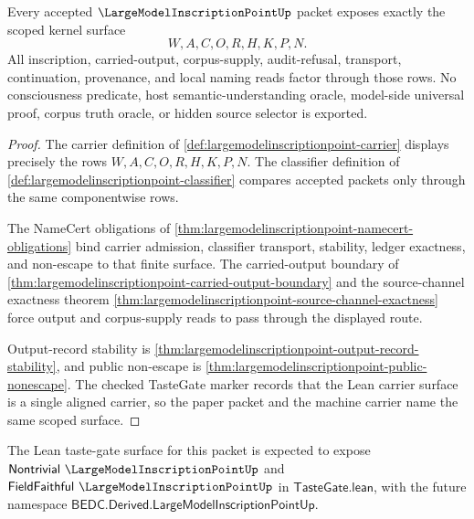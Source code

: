 \begin{theorem}
\label{thm:largemodelinscriptionpoint-scoped-kernel-surface}
Every accepted $\LargeModelInscriptionPointUp$ packet exposes exactly the scoped kernel surface
$$
W,A,C,O,R,H,K,P,N.
$$
All inscription, carried-output, corpus-supply, audit-refusal, transport, continuation, provenance, and local naming reads factor through those rows. No consciousness predicate, host semantic-understanding oracle, model-side universal proof, corpus truth oracle, or hidden source selector is exported.
\end{theorem}
\begin{proof}
The carrier definition of \autoref{def:largemodelinscriptionpoint-carrier} displays precisely the rows $W,A,C,O,R,H,K,P,N$. The classifier definition of \autoref{def:largemodelinscriptionpoint-classifier} compares accepted packets only through the same componentwise rows.

The NameCert obligations of \autoref{thm:largemodelinscriptionpoint-namecert-obligations} bind carrier admission, classifier transport, stability, ledger exactness, and non-escape to that finite surface. The carried-output boundary of \autoref{thm:largemodelinscriptionpoint-carried-output-boundary} and the source-channel exactness theorem \autoref{thm:largemodelinscriptionpoint-source-channel-exactness} force output and corpus-supply reads to pass through the displayed route.

Output-record stability is \autoref{thm:largemodelinscriptionpoint-output-record-stability}, and public non-escape is \autoref{thm:largemodelinscriptionpoint-public-nonescape}. The checked TasteGate marker records that the Lean carrier surface is a single aligned carrier, so the paper packet and the machine carrier name the same scoped surface.
\end{proof}



The Lean taste-gate surface for this packet is expected to expose $\mathsf{Nontrivial}\ \LargeModelInscriptionPointUp$ and $\mathsf{FieldFaithful}\ \LargeModelInscriptionPointUp$ in $\mathsf{TasteGate.lean}$, with the future namespace $\mathsf{BEDC.Derived.LargeModelInscriptionPointUp}$.

